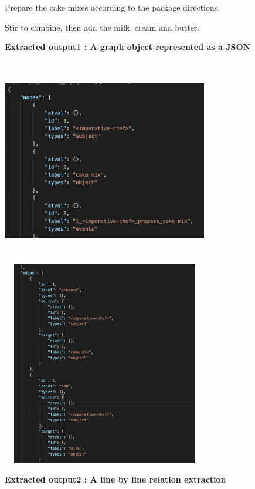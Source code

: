 \documentclass[11pt,letterpaper]{article}
\begin{document}
Prepare the cake mixes according to the package directions.

Stir to combine, then add the milk, cream and butter.

\noindent 
\textbf{Extracted output1 : A graph object represented as a JSON } 
\newline

\includegraphics[width=9cm, height=9cm]{graph_obj1.png}
\includegraphics[width=9cm, height=9cm]{graph_obj2.png}

\noindent
\textbf{Extracted output2 : A line by line relation extraction } 
\end{document}
